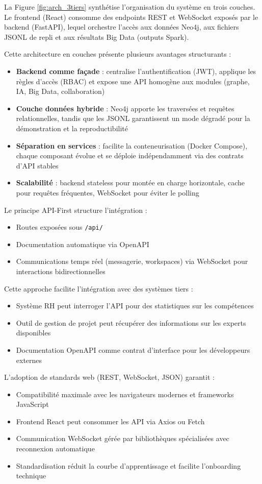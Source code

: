 \documentclass[12pt,a4paper]{report}
\begin{document}
La Figure \ref{fig:arch_3tiers} synthétise l'organisation du système en trois couches. Le frontend (React) consomme des endpoints REST et WebSocket exposés par le backend (FastAPI), lequel orchestre l'accès aux données Neo4j, aux fichiers JSONL de repli et aux résultats Big Data (outputs Spark).

Cette architecture en couches présente plusieurs avantages structurants :
\begin{itemize}
  \item \textbf{Backend comme façade} : centralise l'authentification (JWT), applique les règles d'accès (RBAC) et expose une API homogène aux modules (graphe, IA, Big Data, collaboration)
  \item \textbf{Couche données hybride} : Neo4j apporte les traversées et requêtes relationnelles, tandis que les JSONL garantissent un mode dégradé pour la démonstration et la reproductibilité
  \item \textbf{Séparation en services} : facilite la conteneurisation (Docker Compose), chaque composant évolue et se déploie indépendamment via des contrats d'API stables
  \item \textbf{Scalabilité} : backend stateless pour montée en charge horizontale, cache pour requêtes fréquentes, WebSocket pour éviter le polling
\end{itemize}

Le principe API-First structure l'intégration :
\begin{itemize}
  \item Routes exposées sous \texttt{/api/}
  \item Documentation automatique via OpenAPI
  \item Communications temps réel (messagerie, workspaces) via WebSocket pour interactions bidirectionnelles
\end{itemize}

Cette approche facilite l'intégration avec des systèmes tiers :
\begin{itemize}
  \item Système RH peut interroger l'API pour des statistiques sur les compétences
  \item Outil de gestion de projet peut récupérer des informations sur les experts disponibles
  \item Documentation OpenAPI comme contrat d'interface pour les développeurs externes
\end{itemize}

L'adoption de standards web (REST, WebSocket, JSON) garantit :
\begin{itemize}
  \item Compatibilité maximale avec les navigateurs modernes et frameworks JavaScript
  \item Frontend React peut consommer les API via Axios ou Fetch
  \item Communication WebSocket gérée par bibliothèques spécialisées avec reconnexion automatique
  \item Standardisation réduit la courbe d'apprentissage et facilite l'onboarding technique
\end{itemize}
\end{document}
